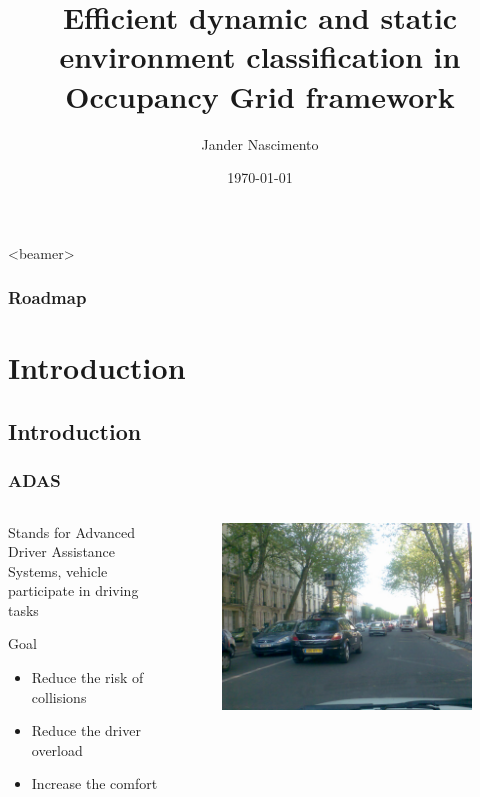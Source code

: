 \documentclass{beamer}
\title[Fast classification]{Efficient dynamic and static environment classification in Occupancy Grid framework}
\author{Jander Nascimento}
\institute{Université Joseph Fourier \\ e-motion (Inria/LIG)}
\date{\today}
\begin{document}
\begin{frame}
\titlepage
\end{frame}

{
  \begin{frame}<beamer>
    \frametitle{Roadmap}
    \tableofcontents%
  \end{frame}
}

	\section{Introduction}
	
\subsection*{Introduction}	

	\begin{frame}
		\frametitle{ADAS}
		
		\begin{columns}[t]
		  \begin{column}{5cm}
			\begin{exampleblock}{Stands for}	
				Advanced Driver Assistance Systems, vehicle participate in driving tasks

			\end{exampleblock}		
			\begin{block}{Goal}
				\begin{itemize}
				\item Reduce the risk of collisions
				\item Reduce the driver overload
				\item Increase the comfort
				\end{itemize}
			\end{block}
		  \end{column}
		  
		  \begin{column}{5cm}
		  \begin{figure}[h]
			\center
			\includegraphics[scale=0.15]{img/fig:street:urban}
		  \end{figure}   
		  \end{column}
		 \end{columns}

	\end{frame}	
\end{document}

